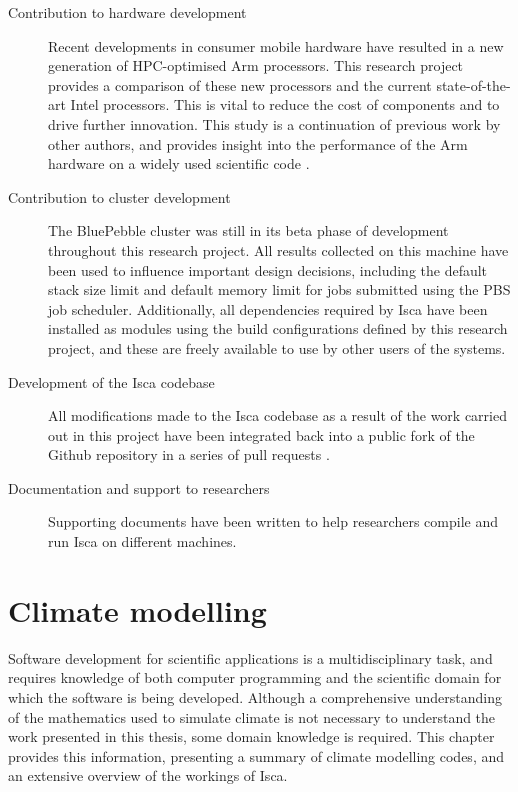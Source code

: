 \documentclass[a4paper,11pt]{report}
\begin{document}
\begin{description}
	\item[Contribution to hardware development] Recent developments in consumer mobile hardware have resulted in a new generation of HPC-optimised Arm processors. This research project provides a comparison of these new processors and the current state-of-the-art Intel processors. This is vital to reduce the cost of components and to drive further innovation. This study is a continuation of previous work by other authors, and provides insight into the performance of the Arm hardware on a widely used scientific code \cite{mcintosh2018performance}.
	
	\item[Contribution to cluster development] The BluePebble cluster was still in its beta phase of development throughout this research project. All results collected on this machine have been used to influence important design decisions, including the default stack size limit and default memory limit for jobs submitted using the PBS job scheduler. Additionally, all dependencies required by Isca have been installed as modules using the build configurations defined by this research project, and these are freely available to use by other users of the systems. 
	
	\item[Development of the Isca codebase] All modifications made to the Isca codebase as a result of the work carried out in this project have been integrated back into a public fork of the Github repository in a series of pull requests \cite{isca2019github}. 
	
	\item[Documentation and support to researchers] Supporting documents have been written to help researchers compile and run Isca on different machines.
	
\end{description}

\chapter{Climate modelling}
\label{chap:background}
Software development for scientific applications is a multidisciplinary task, and requires knowledge of both computer programming and the scientific domain for which the software is being developed. Although a comprehensive understanding of the mathematics used to simulate climate is not necessary to understand the work presented in this thesis, some domain knowledge is required. This chapter provides this information, presenting a summary of climate modelling codes, and an extensive overview of the workings of Isca.
\end{document}
